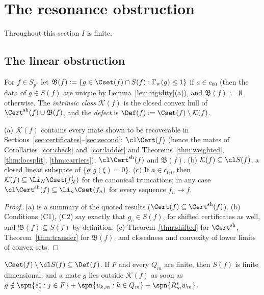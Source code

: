 \section{The resonance obstruction}\label{sec:resonance}

Throughout this section $I$ is finite.

\subsection{The linear obstruction}
For $f\in S_{p^*}$ let $\mathfrak B(f):=\{g\in\Cset(f)\cap S(f):\Gamma_w(g)
\le1\}$ if $a\in c_{00}$ (then the data of $g\in S(f)$ are unique by
Lemma~\ref{lem:rigidity}(a)), and $\mathfrak B(f):=\emptyset$ otherwise.
The \emph{intrinsic class} $\mathcal K(f)$ is the closed convex hull of
$\Cert^{\rm sh}(f)\cup\mathfrak B(f)$, and the \emph{defect} is
$\Def(f):=\Cset(f)\setminus\mathcal K(f)$.

\begin{proposition}\label{prop:intrinsic}
\textup{(a)} $\mathcal K(f)$ contains every mate shown to be recoverable in
Sections~\ref{sec:certificates}--\ref{sec:second}: $\cl\Cert(f)$ (hence the
mates of Corollaries~\ref{cor:check} and~\ref{cor:ladder} and
Theorems~\ref{thm:weighted}, \ref{thm:locsplit}, \ref{thm:carriers}),
$\cl\Cert^{\rm sh}(f)$ and $\mathfrak B(f)$.
\textup{(b)} $\mathcal K(f)\subseteq\cl S(f)$, a closed linear subspace of
$\{g:g(\xi)=0\}$.
\textup{(c)} If $a\in c_{00}$, then $\mathcal K(f)\subseteq\Li_N\Cset(f'_N)$
for the canonical truncations; in any case $\cl\Cert^{\rm sh}(f)\subseteq
\Li_n\Cset(f_n)$ for every sequence $f_n\to f$.
\end{proposition}

\begin{proof}
(a) is a summary of the quoted results ($\Cert(f)\subseteq\Cert^{\rm
sh}(f)$).  (b) Conditions (C1), (C2) say exactly that $g_c\in S(f)$, for
shifted certificates as well, and $\mathfrak B(f)\subseteq S(f)$ by
definition.  (c) Theorem~\ref{thm:shifted} for $\Cert^{\rm sh}$,
Theorem~\ref{thm:transfer} for $\mathfrak B(f)$, and closedness and
convexity of lower limits of convex sets.
\end{proof}

\begin{corollary}\label{cor:linear}
$\Cset(f)\setminus\cl S(f)\subseteq\Def(f)$.  If $F$ and every $Q_m$ are
finite, then $S(f)$ is finite dimensional, and a mate $g$ lies outside
$\mathcal K(f)$ as soon as $g\notin\spn\{e_j^*:j\in F\}+\spn\{u_{k,m}:k\in
Q_m\}+\spn\{R_m^*w_m\}$.
\end{corollary}

